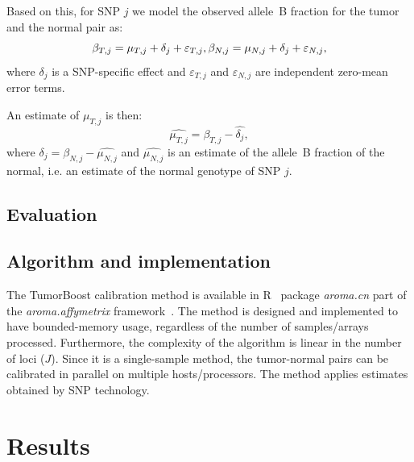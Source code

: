 \documentclass[]{bioinfo}
\newcommand{\eps}{\varepsilon\xspace}
\newcommand{\pkg}[1]{\textit{#1}\xspace}
\begin{document}
\begin{methods}
Based on this, for SNP $j$ we model the observed allele~B fraction for the tumor and the normal pair as:
\begin{equation}
  \beta_{T,j} = \mu_{T,j} + \delta_{j} + \eps_{T,j},\\
  \beta_{N,j} = \mu_{N,j} + \delta_{j} + \eps_{N,j},
  \label{eqnFracBModel}
\end{equation}
where $\delta_{j}$ is a SNP-specific effect and $\eps_{T,j}$ and $\eps_{N,j}$ are independent zero-mean error terms.

An estimate of $\mu_{T,j}$ is then:
\begin{equation}
  \hat{\mu_{T,j}} = \beta_{T,j} - \hat{\delta_{j}},
  \label{eqnTumorBoostEstimate}
\end{equation}
where $\hat{\delta_{j}} = \beta_{N,j} - \hat{\mu_{N,j}}$ and $\hat{\mu_{N,j}}$ is an estimate of the allele~B fraction of the normal, i.e. an estimate of the normal genotype of SNP $j$.


\subsection{Evaluation}
\label{secEvaluation}



\subsection{Algorithm and implementation}
The TumorBoost calibration method is available in R~\citep{RDevel_2008} package \pkg{aroma.cn} part of the \pkg{aroma.affymetrix} framework~\citep{BengtssonH_etal_2008b}.  The  method is designed and implemented to have bounded-memory usage, regardless of the number of samples/arrays processed. 
Furthermore, the complexity of the algorithm is linear in the number of loci ($J$).
Since it is a single-sample method, the tumor-normal pairs can be calibrated in parallel on multiple hosts/processors.
The method applies estimates obtained by SNP technology.
\end{methods}


 
\section{Results}
\label{secResults}
\end{document}
